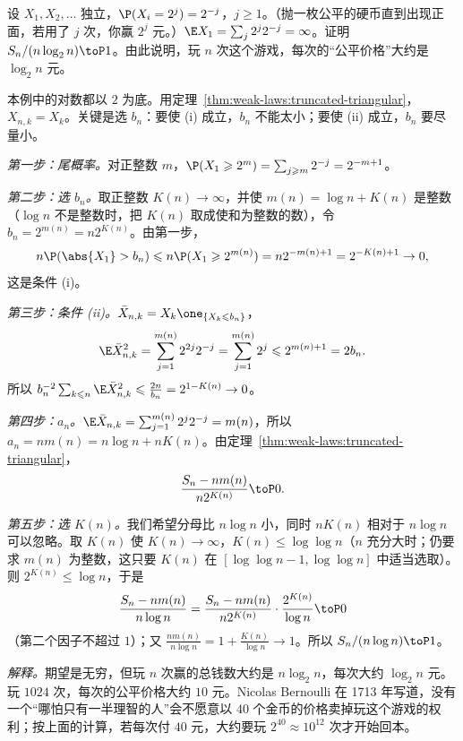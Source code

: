 \begin{workedexample}[St.\ Petersburg 悖论]\label{we:weak-laws:st-petersburg}
设 $X_1,X_2,\dots$ 独立，$\P(X_i=2^j)=2^{-j}$，$j\geqslant1$。（抛一枚公平的硬币直到出现正面，若用了 $j$ 次，你赢 $2^j$ 元。）$\E X_1=\sum_j2^j2^{-j}=\infty$。证明 $S_n/(n\log_2n)\toP1$。由此说明，玩 $n$ 次这个游戏，每次的“公平价格”大约是 $\log_2n$ 元。
\end{workedexample}
\begin{solution}
本例中的对数都以 $2$ 为底。用定理~\ref{thm:weak-laws:truncated-triangular}，$X_{n,k}=X_k$。关键是选 $b_n$：要使 (i) 成立，$b_n$ 不能太小；要使 (ii) 成立，$b_n$ 要尽量小。

\emph{第一步：尾概率。}对正整数 $m$，$\P(X_1\geqslant2^m)=\sum_{j\geqslant m}2^{-j}=2^{-m+1}$。

\emph{第二步：选 $b_n$。}取正整数 $K(n)\to\infty$，并使 $m(n)=\log n+K(n)$ 是整数（$\log n$ 不是整数时，把 $K(n)$ 取成使和为整数的数），令 $b_n=2^{m(n)}=n2^{K(n)}$。由第一步，
\[
n\P(\abs{X_1}>b_n)\leqslant n\P(X_1\geqslant2^{m(n)})=n2^{-m(n)+1}=2^{-K(n)+1}\to0,
\]
这是条件 (i)。

\emph{第三步：条件 (ii)。}$\bar X_{n,k}=X_k\one_{\{X_k\leqslant b_n\}}$，
\[
\E\bar X_{n,k}^2=\sum_{j=1}^{m(n)}2^{2j}2^{-j}=\sum_{j=1}^{m(n)}2^j\leqslant2^{m(n)+1}=2b_n .
\]
所以 $b_n^{-2}\sum_{k\leqslant n}\E\bar X_{n,k}^2\leqslant\frac{2n}{b_n}=2^{1-K(n)}\to0$。

\emph{第四步：$a_n$。}$\E\bar X_{n,k}=\sum_{j=1}^{m(n)}2^j2^{-j}=m(n)$，所以 $a_n=nm(n)=n\log n+nK(n)$。由定理~\ref{thm:weak-laws:truncated-triangular}，
\[
\frac{S_n-nm(n)}{n2^{K(n)}}\toP0 .
\]

\emph{第五步：选 $K(n)$。}我们希望分母比 $n\log n$ 小，同时 $nK(n)$ 相对于 $n\log n$ 可以忽略。取 $K(n)$ 使 $K(n)\to\infty$，$K(n)\leqslant\log\log n$（$n$ 充分大时；仍要求 $m(n)$ 为整数，这只要 $K(n)$ 在 $[\log\log n-1,\log\log n]$ 中适当选取）。则 $2^{K(n)}\leqslant\log n$，于是
\[
\frac{S_n-nm(n)}{n\log n}=\frac{S_n-nm(n)}{n2^{K(n)}}\cdot\frac{2^{K(n)}}{\log n}\toP0
\]
（第二个因子不超过 $1$）；又 $\frac{nm(n)}{n\log n}=1+\frac{K(n)}{\log n}\to1$。所以 $S_n/(n\log n)\toP1$。

\emph{解释。}期望是无穷，但玩 $n$ 次赢的总钱数大约是 $n\log_2n$，每次大约 $\log_2n$ 元。玩 $1024$ 次，每次的公平价格大约 $10$ 元。Nicolas Bernoulli 在 1713 年写道，没有一个“哪怕只有一半理智的人”会不愿意以 $40$ 个金币的价格卖掉玩这个游戏的权利；按上面的计算，若每次付 $40$ 元，大约要玩 $2^{40}\approx10^{12}$ 次才开始回本。
\end{solution}

